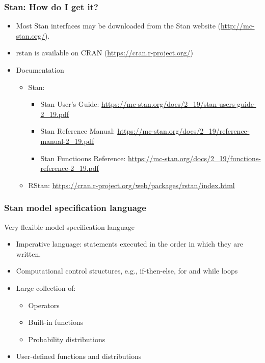 \documentclass{beamer}
\begin{document}
\begin{frame}
  \frametitle{Stan: How do I get it?}

  \begin{itemize}
  \item Most Stan interfaces may be downloaded from the Stan website
    (\url{http://mc-stan.org/}).
\item rstan \cite{rstan-software-219} is available on CRAN
  (\url{https://cran.r-project.org/})
\item Documentation
  \begin{itemize}
  \item Stan:
    \begin{itemize}
    \item Stan User's Guide: \url{https://mc-stan.org/docs/2_19/stan-users-guide-2_19.pdf}
    \item Stan Reference Manual: \url{https://mc-stan.org/docs/2_19/reference-manual-2_19.pdf}
    \item Stan Functioons Reference: \url{https://mc-stan.org/docs/2_19/functions-reference-2_19.pdf}
    \end{itemize}
\item RStan: \url{https://cran.r-project.org/web/packages/rstan/index.html}
  \end{itemize}
  \end{itemize}
  
\end{frame}

\begin{frame}
  \frametitle{Stan model specification language}
  
  Very flexible model specification language
  \begin{itemize}
  \item Imperative language: statements executed in the order in which
    they are written.
  \item Computational control structures, e.g., if-then-else, for and
    while loops
  \item Large collection of:
    \begin{itemize}
    \item Operators
    \item Built-in functions
    \item Probability distributions
    \end{itemize}
  \item User-defined functions and distributions
  \end{itemize}

\end{frame}
\end{document}
